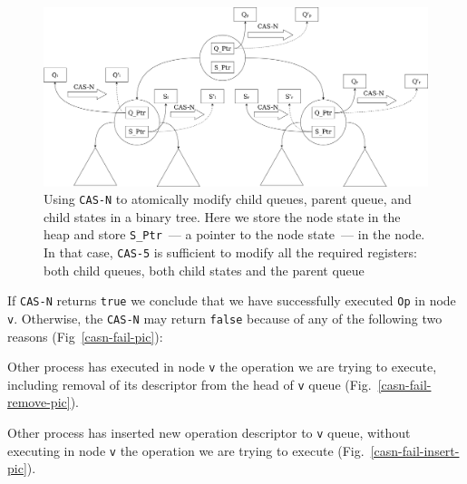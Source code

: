 \documentclass[times, dvipsnames,%
               languages={russian,english} %
              ]{itmo-student-thesis}
\begin{document}
\begin{figure}[H]
  \centering
  \caption{Using \texttt{CAS-N} to atomically modify child queues, parent queue, and child states in a binary tree. Here we store the node state in the heap and store \texttt{S\_Ptr}~--- a pointer to the node state~--- in the node. In that case, \texttt{CAS-5} is sufficient to modify all the required registers: both child queues, both child states and the parent queue}
  \label{execution-casn-pic}
  \includegraphics[width=\linewidth]{pics/execution-casn.png}
\end{figure}

If \texttt{CAS-N} returns \texttt{true} we conclude that we have successfully executed \texttt{Op} in node \texttt{v}. Otherwise, the \texttt{CAS-N} may return \texttt{false} because of any of the following two reasons (Fig~\ref{casn-fail-pic}): 

\begin{nenum}
    \item Other process has executed in node \texttt{v} the operation we are trying to execute, including removal of its descriptor from the head of \texttt{v} queue (Fig.~\ref{casn-fail-remove-pic}).
    
    \item Other process has inserted new operation descriptor to \texttt{v} queue, without executing in node \texttt{v} the operation we are trying to execute (Fig.~\ref{casn-fail-insert-pic}).
\end{nenum}
\end{document}
